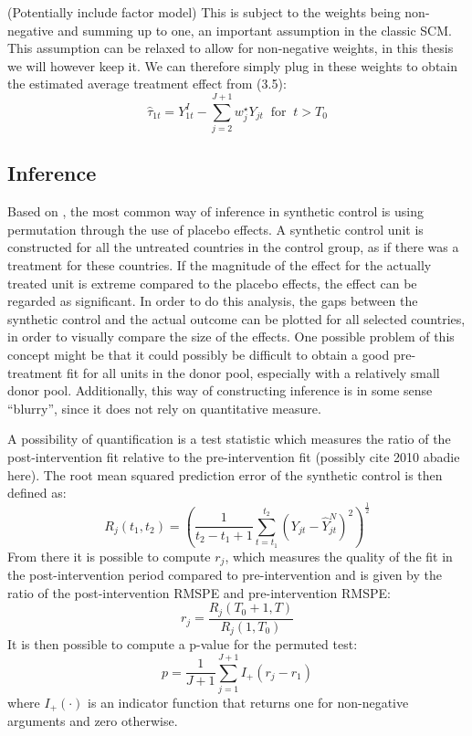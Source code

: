 \documentclass{scrbook}
\begin{document}
(Potentially include factor model) This is subject to the weights being
non-negative and summing up to one, an important assumption in the
classic SCM. This assumption can be relaxed to allow for non-negative
weights, in this thesis we will however keep it. We can therefore simply
plug in these weights to obtain the estimated average treatment effect
from (3.5): \begin{equation}
\hat{\tau}_{1t}=Y_{1t}^{I}-\sum_{j=2}^{J+1} w_{j}^{\star}Y_{jt}\; \; \text{for}\; \; t>T_{0}
\end{equation}

\subsection*{Inference}

Based on \textcite{abadie_synthetic_2010}, the most common way of
inference in synthetic control is using permutation through the use of
placebo effects. A synthetic control unit is constructed for all the
untreated countries in the control group, as if there was a treatment
for these countries. If the magnitude of the effect for the actually
treated unit is extreme compared to the placebo effects, the effect can
be regarded as significant. In order to do this analysis, the gaps
between the synthetic control and the actual outcome can be plotted for
all selected countries, in order to visually compare the size of the
effects. One possible problem of this concept might be that it could
possibly be difficult to obtain a good pre-treatment fit for all units
in the donor pool, especially with a relatively small donor pool.
Additionally, this way of constructing inference is in some sense
``blurry'', since it does not rely on quantitative measure.

A possibility of quantification is a test statistic which measures the
ratio of the post-intervention fit relative to the pre-intervention fit
(possibly cite 2010 abadie here). The root mean squared prediction error
of the synthetic control is then defined as: \begin{equation}
R_{j}(t_{1},t_{2}) =(\frac{1}{t_{2}-t_{1}+1}\sum_{t=t_{1}}^{t_{2}}(Y_{jt}-\hat{Y}_{jt}^{N})^2)^\frac{1}{2}
\end{equation} From there it is possible to compute \(r_{j}\), which
measures the quality of the fit in the post-intervention period compared
to pre-intervention and is given by the ratio of the post-intervention
RMSPE and pre-intervention RMSPE: \begin{equation}
r_{j}=\frac{R_{j}(T_{0}+1,T)}{R_{j}(1,T_{0})}
\end{equation} It is then possible to compute a p-value for the permuted
test: \begin{equation}
p=\frac{1}{J+1}\sum_{j=1}^{J+1}I_{+}(r_{j}-r_{1})
\end{equation} where \(I_{+}(\cdot)\) is an indicator function that
returns one for non-negative arguments and zero otherwise.
\end{document}
